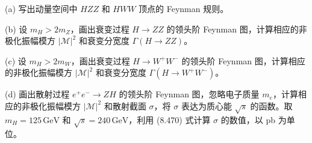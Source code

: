 (a) 写出动量空间中 $HZZ$ 和 $HWW$ 顶点的 Feynman 规则。

(b) 设 $m_H > 2m_Z$，画出衰变过程 $H \to ZZ$ 的领头阶 Feynman 图，计算相应的非极化振幅模方 $|\mathcal{M}|^2$ 和衰变分宽度 $\Gamma (H \to ZZ)$。

(c) 设 $m_H > 2m_W$，画出衰变过程 $H \to W^+ W^-$ 的领头阶 Feynman 图，计算相应的非极化振幅模方 $|\mathcal{M}|^2$ 和衰变分宽度 $\Gamma (H \to W^+ W^-)$。

(d) 画出散射过程 $e^+ e^- \to ZH$ 的领头阶 Feynman 图，忽略电子质量 $m_e$，计算相应的非极化振幅模方 $|\mathcal{M}|^2$ 和散射截面 $\sigma$，将 $\sigma$ 表达为质心能 $\sqrt{s}$ 的函数。取 $m_H = 125 \, \text{GeV}$ 和 $\sqrt{s} = 240 \, \text{GeV}$，利用 (8.470) 式计算 $\sigma$ 的数值，以 pb 为单位。